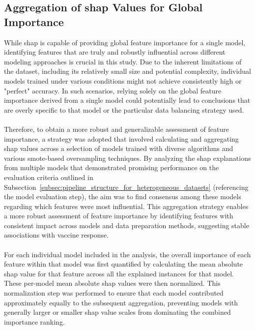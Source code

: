 \documentclass[12pt,a4paper]{report}
\newcommand{\todo}[1]{%
  \par\noindent%
  \begin{tcolorbox}[colback=yellow, colframe=black, boxrule=0.5pt, sharp corners, width=\linewidth, before skip=5pt, after skip=5pt]
    \textbf{TODO:} #1
  \end{tcolorbox}%
  \par
}
\begin{document}
\subsection{Aggregation of \gls{shap} Values for Global Importance}
While \gls{shap} is capable of providing global feature importance for a single model, identifying features that are truly and robustly influential across different modeling approaches is crucial in this study. Due to the inherent limitations of the dataset, including its relatively small size and potential complexity, individual models trained under various conditions might not achieve consistently high or "perfect" accuracy. In such scenarios, relying solely on the global feature importance derived from a single model could potentially lead to conclusions that are overly specific to that model or the particular data balancing strategy used.\\
\\
Therefore, to obtain a more robust and generalizable assessment of feature importance, a strategy was adopted that involved calculating and aggregating \gls{shap} values across a selection of models trained with diverse algorithms and various \gls{smote}-based oversampling techniques. By analyzing the \gls{shap} explanations from multiple models that demonstrated promising performance on the evaluation criteria outlined in Subsection~\ref{subsec:pipeline_structure_for_heterogeneous_datasets} (referencing the model evaluation step), the aim was to find consensus among these models regarding which features were most influential. This aggregation strategy enables a more robust assessment of feature importance by identifying features with consistent impact across models and data preparation methods, suggesting stable associations with vaccine response.\\
\\
For each individual model included in the analysis, the overall importance of each feature within that model was first quantified by calculating the mean absolute \gls{shap} value for that feature across all the explained instances for that model. These per-model mean absolute \gls{shap} values were then normalized. This normalization step was performed to ensure that each model contributed approximately equally to the subsequent aggregation, preventing models with generally larger or smaller \gls{shap} value scales from dominating the combined importance ranking.\\
\end{document}
